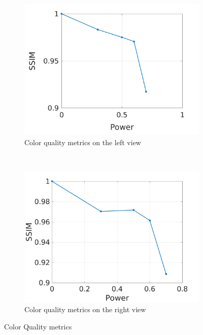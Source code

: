 \begin{figure}[h!]
    \centering
    \begin{subfigure}[t]{0.5\textwidth}
        \centering
\includegraphics[width=1\textwidth]{./img/qm/qm_left.png}
          \caption{\small{Color quality metrics on the left view}}
\label{fig:qmcl}

    \end{subfigure}%
    ~ 
    \begin{subfigure}[t]{0.5\textwidth}
        \centering
\includegraphics[width=1\textwidth]{./img/qm/qm_disp_left.png}
           \caption{\small{Color quality metrics on the right view}}
\label{fig:qmdl}
    \end{subfigure}
    \caption{Color Quality metrics}
    \label{fig:qml}
\end{figure}

